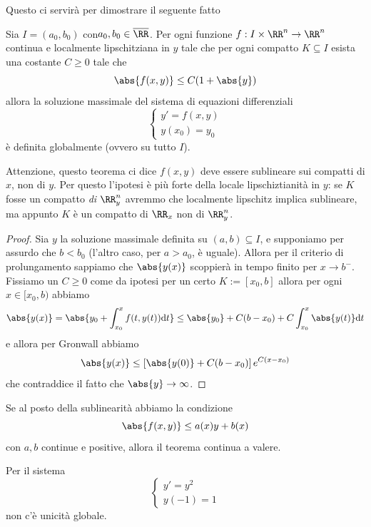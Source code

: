 \documentclass[11pt]{scrartcl}
\newcommand{\dif}{\text{d}}
\begin{document}
	Questo ci servirà per dimostrare il seguente fatto
	\begin{theorem}
		Sia $I=(a_0,b_0)$ con$ a_0,b_0\in\overline{\RR}$. Per ogni funzione $f:I\times \RR^n\to\RR^n$ continua e localmente lipschitziana in $y$ tale che per ogni compatto $K\subseteq I$ esista una costante $C\ge 0$ tale che 
		$$\abs{f(x,y)}\le C(1+\abs{y})$$
		allora la soluzione massimale del sistema di equazioni differenziali
		$$
		\begin{cases}
			y'=f(x,y) \\
			y(x_0)=y_0
		\end{cases}
		$$
		è definita globalmente (ovvero su tutto $I$).
	\end{theorem}
	\begin{remark}
		Attenzione, questo teorema ci dice $f(x,y)$ deve essere sublineare sui compatti di $x$, non di $y$. Per questo l'ipotesi è più forte della locale lipschiztianità in $y$: se $K$ fosse un compatto \textit{di $\RR^n_y$} avremmo che localmente lipschitz implica sublineare, ma appunto $K$ è un compatto di $\RR_x$ non di $\RR^n_y$.  
	\end{remark}
	\begin{proof}
		Sia $y$ la soluzione massimale definita su $(a,b)\subseteq I$, e supponiamo per assurdo che $b<b_0$ (l'altro caso, per $a>a_0$, è uguale). Allora per il criterio di prolungamento sappiamo che $\abs{y(x)}$ scoppierà in tempo finito per $x\to b^-$. Fissiamo un $C\ge 0$ come da ipotesi per un certo $K:=[x_0,b]$ allora per ogni $x\in [x_0,b)$ abbiamo 
		$$\abs{y(x)}=\abs{y_0+\int_{x_0}^x f(t,y(t))\dif t}\le \abs{y_0}+C(b-x_0)+C\int_{x_0}^x \abs{y(t)}\dif t$$
		e allora per Gronwall abbiamo
		$$\abs{y(x)}\le \left[\abs{y(0)}+C(b-x_0)\right]e^{C(x-x_0)}$$
		che contraddice il fatto che $\abs{y}\to \infty$.
	\end{proof}
	\begin{remark}
		Se al posto della sublinearità abbiamo la condizione $$\abs{f(x,y)}\le a(x)y+b(x)$$
		con $a,b$ continue e positive, allora il teorema continua a valere.
	\end{remark}
	\begin{example}
		Per il sistema
		$$
		\begin{cases}
			y'=y^2 \\
			y(-1)=1
		\end{cases}
		$$
		non c'è unicità globale.
	\end{example}
	
\end{document}
